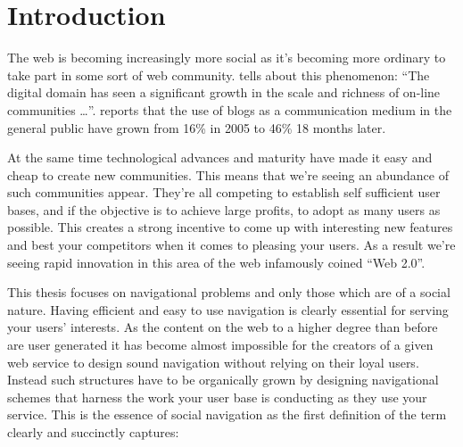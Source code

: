 \chapter{Introduction}

%
%

The web is becoming increasingly more social as it's becoming more ordinary to
take part in some sort of web community. 
\citet[p.~44]{backstrom06} tells about this phenomenon:
``The digital domain has seen a significant growth in the scale and richness
of on-line communities \ldots''. \citet[pt.~1, p.~2]{rosa07} reports that the
use of blogs as a communication medium in the general public have grown from
16\% in 2005 to 46\% 18 months later.


At the same time technological
advances and maturity have made it easy and cheap to create new communities.
This means that we're seeing an abundance of such communities appear.
They're all competing to establish self sufficient user bases, and if the
objective is to achieve large profits, to adopt as many users
as possible. This creates a strong incentive to come up with interesting new
features and best your competitors when it comes to pleasing your users.
As a result we're seeing rapid innovation in this area of the web infamously
coined ``Web 2.0''.%
%

This thesis focuses on navigational problems and only those which are of a
social nature. Having efficient and easy to use navigation is clearly
essential for serving your users' interests. As the content on the web to a
higher degree than before are user generated it has become almost impossible
for the creators of a given web service to design sound navigation without
relying on their loyal users. Instead such structures have to be organically
grown by designing navigational schemes that harness the work your user base
is conducting as they use your service. This is the essence of social
navigation as the first definition of the term clearly and succinctly
captures:

